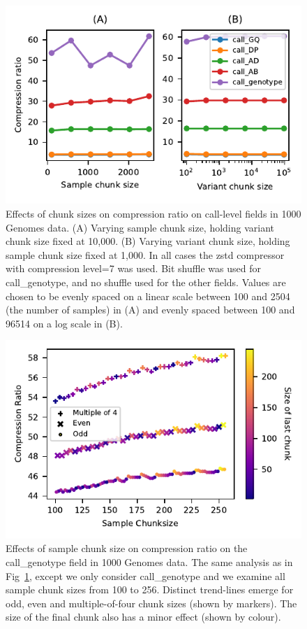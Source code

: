 \documentclass[a4paper,num-refs]{oup-contemporary}
\begin{document}
\begin{figure}[h]
\includegraphics{figures/compression-chunksize}
\caption{Effects of chunk sizes on compression ratio on call-level
fields in 1000 Genomes data.
(A) Varying sample chunk size, holding variant chunk size fixed at 10,000.
(B) Varying variant chunk size, holding sample chunk size fixed at 1,000.
In all cases the zstd compressor with compression level=7 was used. Bit shuffle
was used for call\_genotype, and no shuffle used for the other fields.
Values are chosen to be evenly spaced on a linear scale
between 100 and 2504 (the number of samples) in (A) and
evenly spaced between 100 and 96514 on a log scale in (B).
\label{fig-compression-chunksize}}
\end{figure}

\begin{figure}[h]
\includegraphics{figures/compression-chunksize-finegrained.pdf}
\caption{Effects of sample chunk size on compression ratio on the call\_genotype
field in 1000 Genomes data.
The same analysis as in Fig~\ref{fig-compression-chunksize}, except we only
consider call\_genotype and we examine all sample chunk sizes from
100 to 256. Distinct trend-lines emerge for odd, even and multiple-of-four
chunk sizes (shown by markers). The size of the final chunk also has a minor
effect (shown by colour).
\label{fig-compression-chunksize-finegrained}}
\end{figure}
\end{document}
